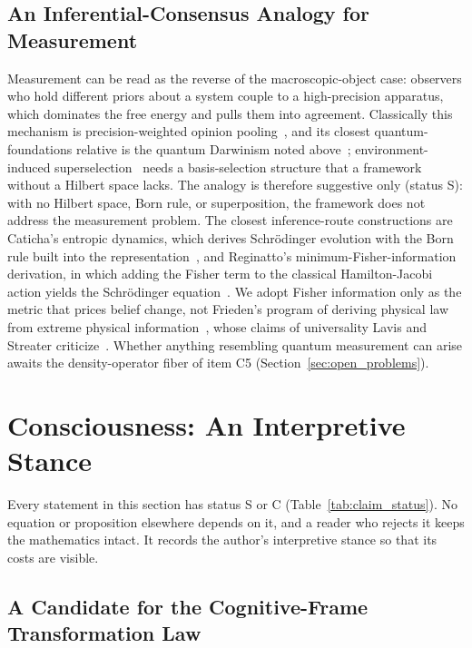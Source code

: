 \subsection{An Inferential-Consensus Analogy for Measurement}
\label{sec:measurement_analogy}

Measurement can be read as the reverse of the macroscopic-object case: observers who hold different priors about a system couple to a high-precision apparatus, which dominates the free energy and pulls them into agreement. Classically this mechanism is precision-weighted opinion pooling~\cite{degroot1974, Aumann1976}, and its closest quantum-foundations relative is the quantum Darwinism noted above~\cite{Zurek2009}; environment-induced superselection~\cite{Zurek2003} needs a basis-selection structure that a framework without a Hilbert space lacks. The analogy is therefore suggestive only (status S): with no Hilbert space, Born rule, or superposition, the framework does not address the measurement problem. The closest inference-route constructions are Caticha's entropic dynamics, which derives Schr\"odinger evolution with the Born rule built into the representation~\cite{Caticha2015, Caticha2019, JohnsonCaticha2011}, and Reginatto's minimum-Fisher-information derivation, in which adding the Fisher term to the classical Hamilton-Jacobi action yields the Schr\"odinger equation~\cite{reginatto1998derivation}. We adopt Fisher information only as the metric that prices belief change, not Frieden's program of deriving physical law from extreme physical information~\cite{frieden1998physics}, whose claims of universality Lavis and Streater criticize~\cite{LavisStreater2002}. Whether anything resembling quantum measurement can arise awaits the density-operator fiber of item C5 (Section~\ref{sec:open_problems}).

\section{Consciousness: An Interpretive Stance}\label{sec:consciousness}

Every statement in this section has status S or C (Table~\ref{tab:claim_status}). No equation or proposition elsewhere depends on it, and a reader who rejects it keeps the mathematics intact. It records the author's interpretive stance so that its costs are visible.

\subsection{A Candidate for the Cognitive-Frame Transformation Law}
\label{sec:lahav_convergence}

